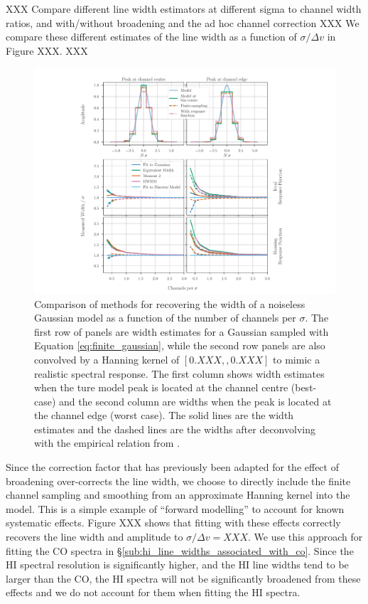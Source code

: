 \documentclass{rnaastex}
\begin{document}
XXX Compare different line width estimators at different sigma to channel width ratios, and with/without broadening and the ad hoc channel correction XXX
We compare these different estimates of the line width as a function of $\sigma/\Delta v$ in Figure XXX. XXX

\begin{figure}
\includegraphics[width=\textwidth]{combined_figure}
\caption{\label{fig:width_recovery_comparison} Comparison of methods for recovering the width of a noiseless Gaussian model as a function of the number of channels per $\sigma$. The first row of panels are width estimates for a Gaussian sampled with Equation \ref{eq:finite_gaussian}, while the second row panels are also convolved by a Hanning kernel of $[0.XXX,, 0.XXX]$ to mimic a realistic spectral response.  The first column shows width estimates when the ture model peak is located at the channel centre (best-case) and the second column are widths when the peak is located at the channel edge (worst case).  The solid lines are the width estimates and the dashed lines are the widths after deconvolving with the empirical relation from \citet{Leroy2016ApJ...831...16L}.}
\end{figure}

Since the correction factor that has previously been adapted for the effect of broadening over-corrects the line width, we choose to directly include the finite channel sampling and smoothing from an approximate Hanning kernel into the model.  This is a simple example of ``forward modelling'' to account for known systematic effects.  Figure XXX shows that fitting with these effects correctly recovers the line width and amplitude to $\sigma/\Delta v = XXX$.  We use this approach for fitting the CO spectra in \S\ref{sub:hi_line_widths_associated_with_co}.  Since the {\sc HI} spectral resolution is significantly higher, and the {\sc HI} line widths tend to be larger than the CO, the {\sc HI} spectra will not be significantly broadened from these effects and we do not account for them when fitting the {\sc HI} spectra.
\end{document}
